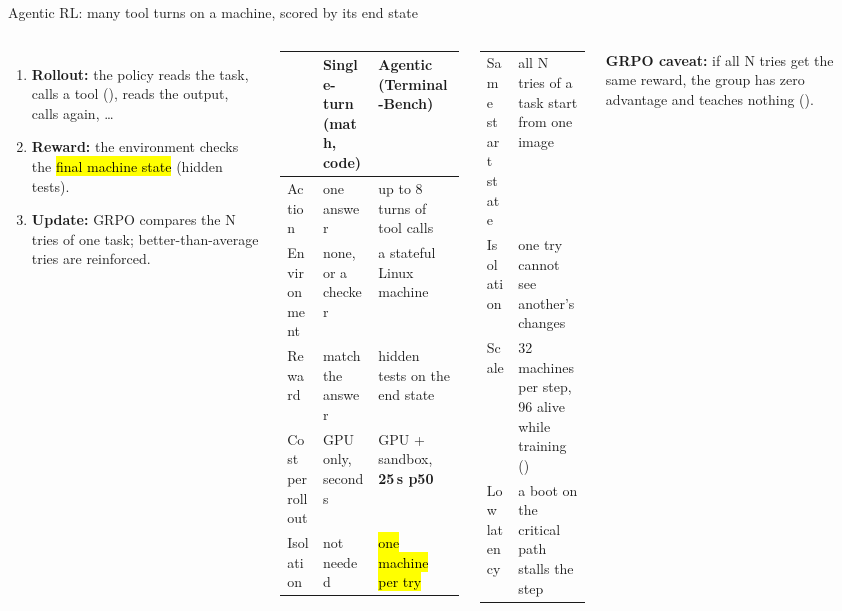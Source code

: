 \begin{frame}{Agentic RL: many tool turns on a machine, scored by its end state}
\begin{columns}[T]
\centering{}\par
\vspace{1.5mm}\raggedright
\begin{enumerate}\scriptsize\setlength{\itemsep}{0.5mm}
\item \textbf{Rollout:} the policy reads the task, calls a tool (), reads the output, calls again, \dots
\item \textbf{Reward:} the environment checks the \hl{final machine state} (hidden tests).
\item \textbf{Update:} GRPO compares the N tries of one task; better-than-average tries are reinforced.
\end{enumerate}
\tiny\setlength{\tabcolsep}{3pt}
\begin{tabularx}{\linewidth}{@{}P{0.2\linewidth}P{0.31\linewidth}Y@{}}
\toprule
& \textbf{Single-turn (math, code)} & \textbf{Agentic (Terminal-Bench)}\\
\midrule
Action & one answer & up to 8 turns of tool calls\\
Environment & none, or a checker & a stateful Linux machine\\
Reward & match the answer & hidden tests on the end state\\
Cost per rollout & GPU only, seconds & GPU + sandbox, \textbf{25\,s p50}\\
Isolation & not needed & \hl{one machine per try}\\
\bottomrule
\end{tabularx}
\par\vspace{2mm}
\tiny
\begin{tabularx}{\linewidth}{@{}P{0.3\linewidth}Y@{}}
\toprule
Same start state & all N tries of a task start from one image\\
Isolation & one try cannot see another's changes\\
Scale & 32 machines per step, 96 alive while training ()\\
Low latency & a boot on the critical path stalls the step\\
\bottomrule
\end{tabularx}
\par\vspace{1mm}
{\tiny\textbf{GRPO caveat:} if all N tries get the same reward, the group has zero advantage and teaches nothing ().\par}
\end{columns}
\end{frame}

